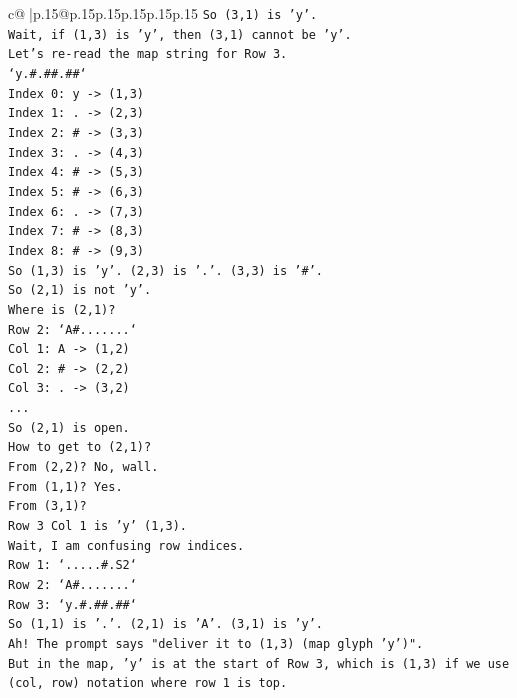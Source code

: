 \documentclass{article}
\begin{document}
{\begin{supertabular}{c@{$\;$}|p{.15\linewidth}@{}p{.15\linewidth}p{.15\linewidth}p{.15\linewidth}p{.15\linewidth}p{.15\linewidth}}
{{{\texttt{So (3,1) is 'y'.} \\
\texttt{Wait, if (1,3) is 'y', then (3,1) cannot be 'y'.} \\
\texttt{Let's re{-}read the map string for Row 3.} \\
\texttt{`y.\#.\#\#.\#\#`} \\
\texttt{Index 0: y {-}> (1,3)} \\
\texttt{Index 1: . {-}> (2,3)} \\
\texttt{Index 2: \# {-}> (3,3)} \\
\texttt{Index 3: . {-}> (4,3)} \\
\texttt{Index 4: \# {-}> (5,3)} \\
\texttt{Index 5: \# {-}> (6,3)} \\
\texttt{Index 6: . {-}> (7,3)} \\
\texttt{Index 7: \# {-}> (8,3)} \\
\texttt{Index 8: \# {-}> (9,3)} \\
\texttt{So (1,3) is 'y'. (2,3) is '.'. (3,3) is '\#'.} \\
\texttt{So (2,1) is not 'y'.} \\
\texttt{Where is (2,1)?} \\
\texttt{Row 2: `A\#.......`} \\
\texttt{Col 1: A {-}> (1,2)} \\
\texttt{Col 2: \# {-}> (2,2)} \\
\texttt{Col 3: . {-}> (3,2)} \\
\texttt{...} \\
\texttt{So (2,1) is open.} \\
\texttt{How to get to (2,1)?} \\
\texttt{From (2,2)? No, wall.} \\
\texttt{From (1,1)? Yes.} \\
\texttt{From (3,1)?} \\
\texttt{Row 3 Col 1 is 'y' (1,3).} \\
\texttt{Wait, I am confusing row indices.} \\
\texttt{Row 1: `.....\#.S2`} \\
\texttt{Row 2: `A\#.......`} \\
\texttt{Row 3: `y.\#.\#\#.\#\#`} \\
\texttt{So (1,1) is '.'. (2,1) is 'A'. (3,1) is 'y'.} \\
\texttt{Ah! The prompt says "deliver it to (1,3) (map glyph 'y')".} \\
\texttt{But in the map, 'y' is at the start of Row 3, which is (1,3) if we use (col, row) notation where row 1 is top.} \\
}}}
\end{supertabular}}
\end{document}
